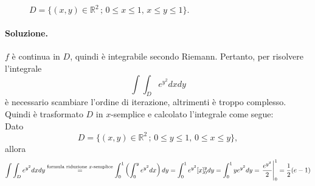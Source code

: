 \begin{example}
\begin{figure}[ht]
		\caption{$D = \{(x,y)\in\mathbb{R}^2\,;\, 0\leq x\leq 1,\, x\leq y\leq 1\}$.}
		\label{fig:esempio_dominio_y_semplice_1}
	\end{figure}
	
	\paragraph{Soluzione.} $f$ è continua in $D$, quindi è integrabile secondo Riemann. Pertanto, per risolvere l'integrale
	\begin{equation}\label{eq:esempio_integrale_dominio_y_semplice}
		\int\int_D e^{y^2} dxdy
	\end{equation}
	è necessario scambiare l'ordine di iterazione, altrimenti è troppo complesso. Quindi è trasformato $D$ in $x$-semplice e calcolato l'integrale come segue:\\
	Dato
	\begin{equation*}
		D = \{(x,y)\in\mathbb{R}^2\,;\, 0\leq y\leq 1,\, 0\leq x\leq y\},
	\end{equation*}
	allora
	\begin{equation*}
		\int\int_D e^{y^2} dxdy \overset{\text{formula riduzione } x \text{-semplice}}{=} \int_0^1\left(\int_0^y e^{y^2} dx\right)dy = \int_0^1 e^{y^2}[x]_0^y dy = \int_0^1 y e^{y^2}dy = \left.\frac{e^{y^2}}{2}\right\rvert_{0}^{1} = \frac{1}{2}(e-1)
	\end{equation*}

\end{example}
